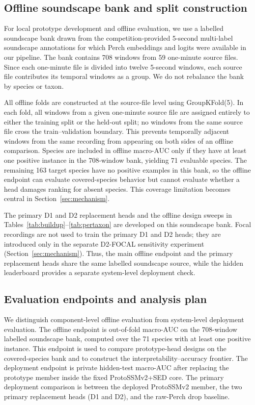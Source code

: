\documentclass{ceurart}
\begin{document}
\subsection{Offline soundscape bank and split construction}
\label{sec:evalbank}

For local prototype development and offline evaluation, we use a labelled soundscape bank drawn from the competition-provided 5-second multi-label soundscape annotations for which Perch embeddings and logits were available in our pipeline. The bank contains 708 windows from 59 one-minute source files. Since each one-minute file is divided into twelve 5-second windows, each source file contributes its temporal windows as a group. We do not rebalance the bank by species or taxon.

All offline folds are constructed at the source-file level using GroupKFold(5). In each fold, all windows from a given one-minute source file are assigned entirely to either the training split or the held-out split; no windows from the same source file cross the train--validation boundary. This prevents temporally adjacent windows from the same recording from appearing on both sides of an offline comparison. Species are included in offline macro-AUC only if they have at least one positive instance in the 708-window bank, yielding 71 evaluable species. The remaining 163 target species have no positive examples in this bank, so the offline endpoint can evaluate covered-species behavior but cannot evaluate whether a head damages ranking for absent species. This coverage limitation becomes central in Section~\ref{sec:mechanism}.

The primary D1 and D2 replacement heads and the offline design sweeps in Tables~\ref{tab:buildup}--\ref{tab:pertaxon} are developed on this soundscape bank. Focal recordings are not used to train the primary D1 and D2 heads; they are introduced only in the separate D2-FOCAL sensitivity experiment (Section~\ref{sec:mechanism}). Thus, the main offline endpoint and the primary replacement heads share the same labelled soundscape source, while the hidden leaderboard provides a separate system-level deployment check.

\subsection{Evaluation endpoints and analysis plan}
\label{sec:endpoints}

We distinguish component-level offline evaluation from system-level deployment evaluation. The offline endpoint is out-of-fold macro-AUC on the 708-window labelled soundscape bank, computed over the 71 species with at least one positive instance. This endpoint is used to compare prototype-head designs on the covered-species bank and to construct the interpretability--accuracy frontier. The deployment endpoint is private hidden-test macro-AUC after replacing the prototype member inside the fixed ProtoSSMv2+SED core. The primary deployment comparison is between the deployed ProtoSSMv2 member, the two primary replacement heads (D1 and D2), and the raw-Perch drop baseline.
\end{document}
